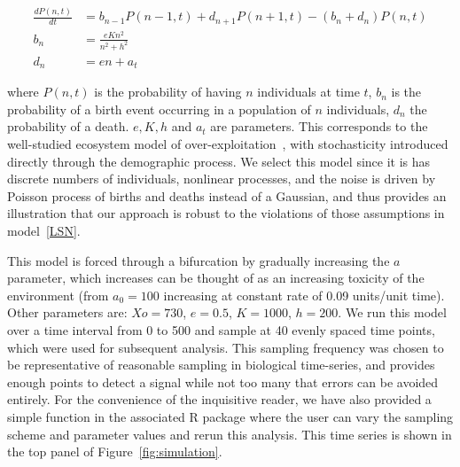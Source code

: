 \documentclass[authoryear,review,11pt]{elsarticle}
\begin{document}
\begin{align}
  \frac{dP(n,t)}{dt} &= b_{n-1} P(n-1,t) + d_{n+1}P(n+1,t) - (b_n+d_n) P(n,t)  \label{master} \\
    b_n &= \frac{e K n^2}{n^2 + h^2} \\
    d_n &= e n + a_t
\end{align}

where $P(n,t)$ is the probability of having $n$ individuals at time $t$, $b_n$ is the probability of a birth event occurring in a population of $n$ individuals, $d_n$ the probability of a death.  $e, K, h$ and $a_t$ are parameters.  
This corresponds to the well-studied ecosystem model of over-exploitation~\citep{Noy-Meir1975, May1977},
with stochasticity introduced directly through the demographic process.
We select this model since it is has discrete numbers of individuals, 
nonlinear processes, and the noise is driven by Poisson process of births and deaths instead of a Gaussian, 
and thus provides an illustration that our approach is robust to the violations of those
assumptions in model~\eqref{LSN}. 

This model is forced through a bifurcation by gradually increasing the $a$ parameter,
which increases can be thought of as an increasing toxicity of the environment
(from $a_0 = 100$ increasing at constant rate of 0.09 units/unit time).
Other parameters are: $Xo = 730$, $e = 0.5$, $K = 1000$, $h = 200$.
We run this model over a time interval from 0 to 500
and sample at 40 evenly spaced time points, which were used for subsequent analysis.
This sampling frequency was chosen to be representative of reasonable sampling in biological time-series,
and provides enough points to detect a signal while not too many that errors can be avoided entirely.  
For the convenience of the inquisitive reader, we have also provided a simple function in the
associated R package where the user can vary the sampling scheme and parameter values and rerun this analysis.
This time series is shown in the top panel of Figure~\ref{fig:simulation}.


\end{document}
